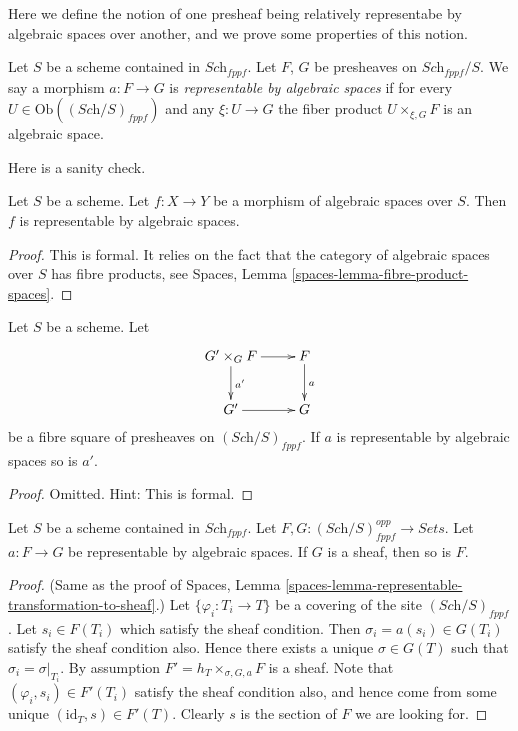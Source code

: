 \noindent
Here we define the notion of one presheaf being relatively representabe
by algebraic spaces over another, and we prove some properties of this notion.

\begin{definition}
\label{definition-morphism-representable-by-spaces}
Let $S$ be a scheme contained in $\textit{Sch}_{fppf}$.
Let $F$, $G$ be presheaves on $\textit{Sch}_{fppf}/S$.
We say a morphism $a : F \to G$ is
{\it representable by algebraic spaces}
if for every $U \in \text{Ob}((\textit{Sch}/S)_{fppf})$ and
any $\xi : U \to G$ the fiber product $U \times_{\xi, G} F$
is an algebraic space.
\end{definition}

\noindent
Here is a sanity check.

\begin{lemma}
\label{lemma-morphism-spaces-is-representable-by-spaces}
Let $S$ be a scheme.
Let $f : X \to Y$ be a morphism of algebraic spaces over $S$.
Then $f$ is representable by algebraic spaces.
\end{lemma}

\begin{proof}
This is formal. It relies on the fact that
the category of algebraic spaces over $S$ has fibre products, see
Spaces, Lemma \ref{spaces-lemma-fibre-product-spaces}.
\end{proof}

\begin{lemma}
\label{lemma-base-change-transformation}
Let $S$ be a scheme. Let
$$
\xymatrix{
G' \times_G F \ar[r] \ar[d]^{a'} & F \ar[d]^a \\
G' \ar[r] & G
}
$$
be a fibre square of presheaves on $(\textit{Sch}/S)_{fppf}$.
If $a$ is representable by algebraic spaces so is $a'$.
\end{lemma}

\begin{proof}
Omitted. Hint: This is formal.
\end{proof}

\begin{lemma}
\label{lemma-representable-by-spaces-transformation-to-sheaf}
Let $S$ be a scheme contained in $\textit{Sch}_{fppf}$.
Let $F, G : (\textit{Sch}/S)_{fppf}^{opp} \to \textit{Sets}$.
Let $a : F \to G$ be representable by algebraic spaces.
If $G$ is a sheaf, then so is $F$.
\end{lemma}

\begin{proof}
(Same as the proof of
Spaces, Lemma \ref{spaces-lemma-representable-transformation-to-sheaf}.)
Let $\{\varphi_i : T_i \to T\}$ be a covering of the site
$(\textit{Sch}/S)_{fppf}$.
Let $s_i \in F(T_i)$ which satisfy the sheaf condition.
Then $\sigma_i = a(s_i) \in G(T_i)$ satisfy the sheaf condition
also. Hence there exists a unique $\sigma \in G(T)$ such
that $\sigma_i = \sigma|_{T_i}$. By assumption
$F' = h_{T} \times_{\sigma, G, a} F$ is a sheaf.
Note that $(\varphi_i, s_i) \in F'(T_i)$ satisfy the
sheaf condition also, and hence come from some unique
$(\text{id}_T, s) \in F'(T)$. Clearly $s$ is the section of
$F$ we are looking for.
\end{proof}

